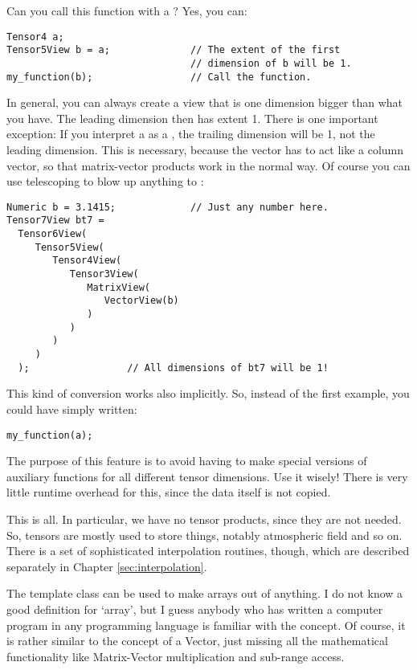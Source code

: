 \noindent Can you call this function with a ? Yes, you can:
\begin{verbatim}
Tensor4 a;                      
Tensor5View b = a;              // The extent of the first
                                // dimension of b will be 1.
my_function(b);                 // Call the function.
\end{verbatim}

In general, you can always create a view that is one dimension bigger
than what you have. The leading dimension then has extent 1. There is
one important exception: If you interpret a  as a
, the trailing dimension will be 1, not the leading
dimension. This is necessary, because the vector has to act like a
column vector, so that matrix-vector products work in the normal way.
Of course you can use telescoping to blow up anything to
: 

\begin{verbatim}
Numeric b = 3.1415;             // Just any number here.
Tensor7View bt7 =
  Tensor6View(
     Tensor5View(
        Tensor4View(
           Tensor3View(
              MatrixView(
                 VectorView(b)
              )
           )
        )
     )
  );                 // All dimensions of bt7 will be 1!
\end{verbatim}

This kind of conversion works also implicitly. So, instead of the
first example, you could have simply written:
\begin{verbatim}
my_function(a);
\end{verbatim}

The purpose of this feature is to avoid having to make special
versions of auxiliary functions for all different tensor
dimensions. Use it wisely! There is very little runtime overhead for
this, since the data itself is not copied.


This is all. In particular, we have no tensor products, since they
are not needed. So, tensors are mostly used to store things, notably
atmospheric field and so on.  There is a set of sophisticated
interpolation routines, though, which are described separately in
Chapter \ref{sec:interpolation}.


\label{sec:matpack:arrays}

The template class  can be used to make arrays out of
anything. I do not know a good definition for `array', but I guess
anybody who has written a computer program in any programming language
is familiar with the concept. Of course, it is rather similar to the
concept of a Vector, just missing all the mathematical functionality
like Matrix-Vector multiplication and sub-range access.

